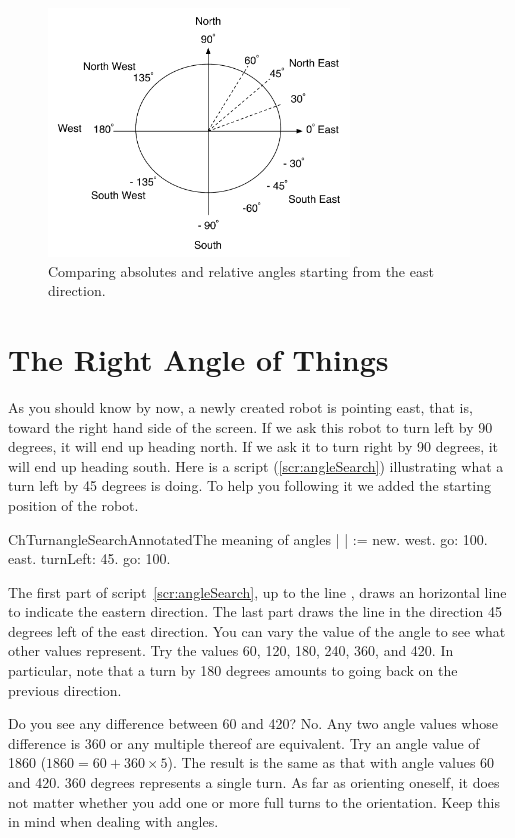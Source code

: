 \begin{figure}[h]
\begin{center}\includegraphics[width=8cm]{roseDesVentsRelatifToo}
\caption{Comparing absolutes and relative angles starting from the east direction.\label{fig:roserelative}}
\end{center}
\end{figure}


\section{The Right Angle of Things}\label{sec:angles}
As you should know by now, a newly created robot is pointing east,
that is, toward the right hand side of the screen. If we ask this
robot to turn left by 90 degrees, it will end up heading north. If we
ask it to turn right by 90 degrees, it will end up heading south. Here
is a script (\ref{scr:angleSearch}) illustrating what a turn left by 45 degrees is doing. To help you following it we added the starting position of the robot.

\begin{scriptfig}{ChTurnangleSearchAnnotated}{The meaning of angles} \label{scr:angleSearch}
| \caro |
\caro := \Turtle new.
\caro west.
\caro go: 100.
\caro east.
\caro turnLeft: 45.
\caro go: 100.
\end{scriptfig}

The first part of script~\ref{scr:angleSearch}, up to the line , draws an
horizontal line to indicate the eastern direction. The last part draws
the line in the direction 45 degrees left of the east direction. You
can vary the value of the angle to see what other values
represent. Try the values 60, 120, 180, 240, 360, and 420. In
particular, note that a turn by 180 degrees amounts to going back on the
previous direction.

Do you see any difference between 60 and 420? No. Any two angle values
whose difference is 360 or any multiple thereof are equivalent. Try an
angle value of  1860 ($1860 = 60  + 360 \times 5$). The  result is the
same as  that with angle values  60 and 420.  360  degrees represents a
single turn. As  far as orienting oneself, it  does not matter whether
you add one  or more full turns to the orientation.  Keep this in mind
when dealing with angles.

